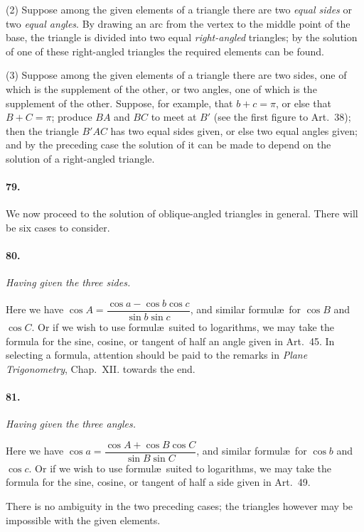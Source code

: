 \documentclass{book}[2004/02/16]
\begin{document}
\begin{mainmatter}
\begin{spacing}{1.3}
(2) Suppose among the given elements of a triangle there are
two \textit{equal sides} or two \textit{equal angles}. By drawing an arc from the
vertex to the middle point of the base, the triangle is divided into
two equal \textit{right-angled} triangles; by the solution of one of these
right-angled triangles the required elements can be found.

(3) Suppose among the given elements of a triangle there
are two sides, one of which is the supplement of the other, or two
angles, one of which is the supplement of the other. Suppose, for
example, that $b + c = \pi$, or else that $B + C = \pi$; produce $BA$ and
$BC$ to meet at $B'$ (see the first figure to Art.\ 38); then the triangle
$B'AC$ has two equal sides given, or else two equal angles given;
and by the preceding case the solution of it can be made to depend
on the solution of a right-angled triangle.

\paragraph{79.} We now proceed to the solution of oblique-angled triangles
in general. There will be six cases to consider.

\paragraph{80.} \textit{Having given the three sides.}

Here we have $\cos A = \dfrac{\cos a - \cos b \cos c}{\sin b \sin c}$, and similar formul\ae\
for $\cos B$ and $\cos C$. Or if we wish to use formul\ae\ suited to logarithms,
we may take the formula for the sine, cosine, or tangent of
half an angle given in Art.~45. In selecting a formula, attention
should be paid to the remarks in \textit{Plane Trigonometry}, Chap.~XII.
towards the end.

\paragraph{81.} \textit{Having given the three angles.}

Here we have $\cos a = \dfrac{\cos A + \cos B \cos C}{\sin B \sin C}$, and similar formul\ae\
for $\cos b$ and $\cos c$. Or if we wish to use formul\ae\ suited to logarithms,
we may take the formula for the sine, cosine, or tangent of
half a side given in Art.~49.

There is no ambiguity in the two preceding cases; the triangles
however may be impossible with the given elements.


\end{spacing}
\end{mainmatter}
\end{document}
